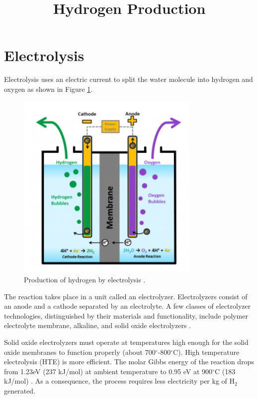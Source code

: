 \documentclass[11pt,letterpaper]{article}
\title{Hydrogen Production}
\begin{document}

\section{Electrolysis}

Electrolysis uses an electric current to split the water molecule into hydrogen and oxygen as shown in Figure \ref{fig:electro}.


\begin{figure}[]
	\centering
	\includegraphics[width=0.55\linewidth]{figures/electrolysis.png}
	\hfill
	\caption{Production of hydrogen by electrolysis \cite{doe_office_of_energy_efficiency_and_renewable_energy_hydrogen_2020}.}
	\label{fig:electro}
\end{figure}


The reaction takes place in a unit called an electrolyzer.
Electrolyzers consist of an anode and a cathode separated by an electrolyte.
A few classes of electrolyzer technologies, distinguished by their materials and functionality, include polymer electrolyte membrane, alkaline, and solid oxide electrolyzers \cite{doe_office_of_energy_efficiency_and_renewable_energy_hydrogen_2020}.

Solid oxide electrolyzers must operate at temperatures high enough for the solid oxide membranes to function properly (about 700$^{\circ}$-800$^{\circ}$C).
High temperature electrolysis (HTE) is more efficient.
The molar Gibbs energy of the reaction drops from 1.23eV (237 kJ/mol) at ambient temperature to 0.95 eV at 900$^{\circ}$C (183 kJ/mol) \cite{helmeth_high_2020}.
As a consequence, the process requires less electricity per kg of H$_2$ generated.
\end{document}
